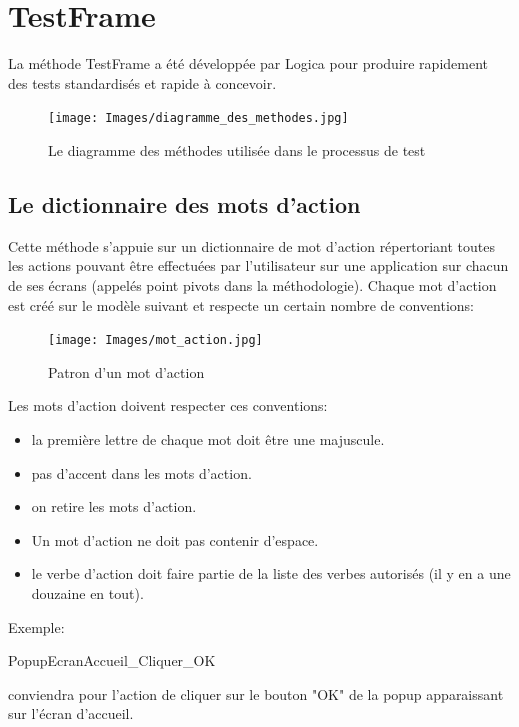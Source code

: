 \section{TestFrame}

La méthode TestFrame a été développée par Logica pour produire rapidement des tests standardisés et rapide à concevoir.

\begin{figure}[h]
  \begin{center}
    \texttt{[image: Images/diagramme\_des\_methodes.jpg]}
  \end{center}
  \caption{Le diagramme des méthodes utilisée dans le processus de test}
  \label{Le diagramme des méthodes utilisée dans le processus de test}
\end{figure}
\subsection{Le dictionnaire des mots d'action}
Cette méthode s'appuie sur un dictionnaire de mot d'action répertoriant toutes les actions pouvant être effectuées par l'utilisateur sur une application sur chacun de ses écrans (appelés point pivots dans la méthodologie).
Chaque mot d'action est créé sur le modèle suivant et respecte un certain nombre de conventions:

\begin{figure}[h]
  \begin{center}
    \texttt{[image: Images/mot\_action.jpg]}
  \end{center}
  \caption{Patron d'un mot d'action}
  \label{Patron d'un mot d'action}
\end{figure}

Les mots d'action doivent respecter ces conventions:
\begin{itemize}
\item la première lettre de chaque mot doit être une majuscule.
\item pas d'accent dans les mots d'action.
\item on retire les mots d'action.
\item Un mot d'action ne doit pas contenir d'espace.
\item le verbe d'action doit faire partie de la liste des verbes autorisés (il y en a une douzaine en tout).
\end{itemize}

Exemple:\begin{bf}PopupEcranAccueil\_Cliquer\_OK\end{bf} conviendra pour l'action de cliquer sur le bouton "OK" de la popup apparaissant sur l'écran d'accueil.

